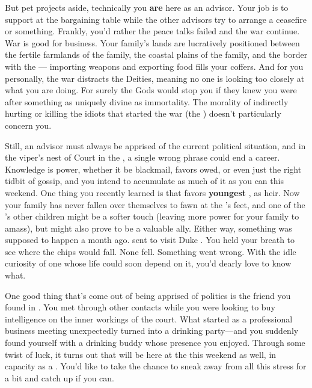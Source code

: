 \documentclass[char]{GL2020}
\begin{document}
But pet projects aside, technically you \textbf{are} here as an advisor. Your job is to support \cEvil{} at the bargaining table while the other advisors try to arrange a ceasefire or something. Frankly, you’d rather the peace talks failed and the war continue. War is good for business. Your family’s lands are lucratively positioned between the fertile farmlands of the \cChupStudent{\formal} family, the coastal plains of the \cWildCard{\formal} family, and the border with the \pTech{} — importing weapons and exporting food fills your coffers. And for you personally, the war distracts the Deities, meaning no one is looking too closely at what you are doing. For surely the Gods would stop you if they knew you were after something as uniquely divine as immortality. The morality of indirectly hurting or killing the idiots that started the war (the \pShip{}) doesn’t particularly concern you.

Still, an advisor must always be apprised of the current political situation, and in the viper's nest of Court in the \pFarm{}, a single wrong phrase could end a career. Knowledge is power, whether it be blackmail, favors owed, or even just the right tidbit of gossip, and you intend to accumulate as much of it as you can this weekend. One thing you recently learned is that \cQueen{\Majesty} \cQueen{} favors \cQueen{\their} \textbf{youngest} \cPrince{\child}, \cPrince{} as \cQueen{\their} heir. Now your family has never fallen over themselves to fawn at the \cQueen{\Majesty}’s feet, and one of the \cQueen{\Majesty}’s other children might be a softer touch (leaving more power for your family to amass), but \cPrince{} might also prove to be a valuable ally. Either way, something was supposed to happen a month ago. \cQueen{\Majesty} \cQueen{} sent \cPrince{} to visit Duke \cChupStudent{\formal}. You held your breath to see where the chips would fall. None fell. Something went wrong. With the idle curiosity of one whose life could soon depend on it, you’d dearly love to know what.

One good thing that’s come out of being apprised of politics is the friend you found in \cHedonist{\full}. You met \cHedonist{} through other contacts while you were looking to buy intelligence on the inner workings of the court. What started as a professional business meeting unexpectedly turned into a drinking party---and you suddenly found yourself with a drinking buddy whose presence you enjoyed. Through some twist of luck, it turns out that \cHedonist{} will be here at the \pSc{} this weekend as well, in \cHedonist{\their} capacity as a \cHedonist{\cleric}. You’d like to take the chance to sneak away from all this stress for a bit and catch up if you can.
\end{document}
